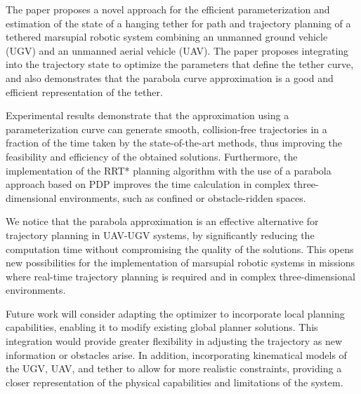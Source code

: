 
The paper proposes a novel approach for the efficient parameterization and estimation of the state of a hanging tether for path and trajectory planning of a tethered marsupial robotic system combining an unmanned ground vehicle (UGV) and an unmanned aerial vehicle (UAV). The paper proposes integrating into the trajectory state to optimize the parameters that define the tether curve, and also demonstrates that the parabola curve approximation is a good and efficient representation of the tether.

Experimental results demonstrate that the approximation using a parameterization curve can generate smooth, collision-free trajectories in a fraction of the time taken by the state-of-the-art methods, thus improving the feasibility and efficiency of the obtained solutions. Furthermore, the implementation of the RRT* planning algorithm with the use of a parabola approach based on PDP improves the time calculation in complex three-dimensional environments, such as confined or obstacle-ridden spaces.

We notice that the parabola approximation is an effective alternative for trajectory planning in UAV-UGV systems, by significantly reducing the computation time without compromising the quality of the solutions. This opens new possibilities for the implementation of marsupial robotic systems in missions where real-time trajectory planning is required and in complex three-dimensional environments.

Future work will consider adapting the optimizer to incorporate local planning capabilities, enabling it to modify existing global planner solutions. This integration would provide greater flexibility in adjusting the trajectory as new information or obstacles arise. In addition, incorporating kinematical models of the UGV, UAV, and tether to allow for more realistic constraints, providing a closer representation of the physical capabilities and limitations of the system. 




